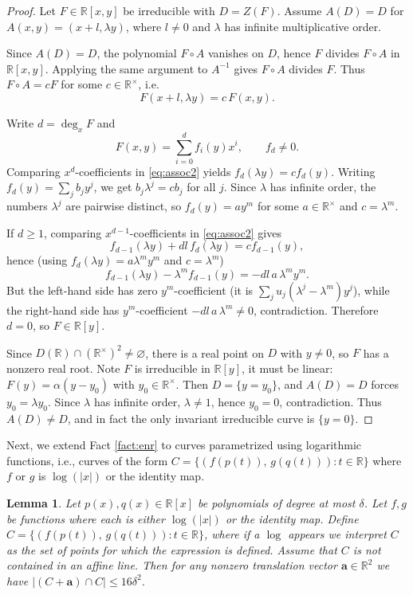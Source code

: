 \documentclass[12pt,reqno]{amsart}
\numberwithin{equation}{section}
\newtheorem{lemma}[theorem]{Lemma}
\begin{document}
\begin{proof}
Let $F\in\mathbb R[x,y]$ be irreducible with $D=Z(F)$.
Assume $A(D)=D$ for $A(x,y)=(x+l,\lambda y)$, where $l\neq 0$ and $\lambda$ has infinite multiplicative order.

Since $A(D)=D$, the polynomial $F\circ A$ vanishes on $D$, hence $F$ divides $F\circ A$ in $\mathbb R[x,y]$.
Applying the same argument to $A^{-1}$ gives $F\circ A$ divides $F$.
Thus $F\circ A=cF$ for some $c\in\mathbb R^\times$, i.e.
\begin{equation}\label{eq:assoc2}
F(x+l,\lambda y)=c\,F(x,y).
\end{equation}

Write $d=\deg_xF$ and
\[
F(x,y)=\sum_{i=0}^d f_i(y)x^i,\qquad f_d\neq 0.
\]
Comparing $x^d$-coefficients in \eqref{eq:assoc2} yields $f_d(\lambda y)=c f_d(y)$.
Writing $f_d(y)=\sum_j b_jy^j$, we get $b_j\lambda^j=cb_j$ for all $j$.
Since $\lambda$ has infinite order, the numbers $\lambda^j$ are pairwise distinct, so $f_d(y)=ay^m$ for some
$a\in\mathbb R^\times$ and $c=\lambda^m$.

If $d\ge 1$, comparing $x^{d-1}$-coefficients in \eqref{eq:assoc2} gives
\[
f_{d-1}(\lambda y)+dl\,f_d(\lambda y)=c f_{d-1}(y),
\]
hence (using $f_d(\lambda y)=a\lambda^my^m$ and $c=\lambda^m$)
\[
f_{d-1}(\lambda y)-\lambda^m f_{d-1}(y)=-dl\,a\,\lambda^m y^m.
\]
But the left-hand side has zero $y^m$-coefficient (it is $\sum_j u_j(\lambda^j-\lambda^m)y^j$),
while the right-hand side has $y^m$-coefficient $-dl\,a\,\lambda^m\neq 0$, contradiction.
Therefore $d=0$, so $F\in\mathbb R[y]$.

Since $D(\mathbb R)\cap(\mathbb R^\times)^2\neq\varnothing$, there is a real point on $D$ with $y\neq 0$,
so $F$ has a nonzero real root. Note $F$ is irreducible in $\mathbb R[y]$, it must be linear:
$F(y)=\alpha(y-y_0)$ with $y_0\in\mathbb R^\times$.
Then $D=\{y=y_0\}$, and $A(D)=D$ forces $y_0=\lambda y_0$.
Since $\lambda$ has infinite order, $\lambda\neq 1$, hence $y_0=0$, contradiction.
Thus $A(D)\neq D$, and in fact the only invariant irreducible curve is $\{y=0\}$.
\end{proof}



	
Next, we extend Fact \ref{fact:enr} to curves parametrized using logarithmic functions, i.e., curves of the form  $C = \{(f(p(t)),\, g(q(t))): t \in \mathbb{R}\}$ where $f$ or $g$ is $\log(|x|)$ or the identity map.  


\begin{lemma}\label{lem:sze1}
Let $p(x),q(x)\in\mathbb R[x]$ be polynomials of degree at most $\delta$.
Let $f,g$ be functions where each is either $\log(|x|)$ or the identity map.
Define
$C=\{(f(p(t)),\,g(q(t))): t\in\mathbb R\}$,
where if a $\log$ appears we interpret $C$ as the set of points for which the expression is defined.
Assume that $C$ is not contained in an affine line.
Then for any nonzero translation vector $\mathbf a\in\mathbb R^2$ we have $|(C+\mathbf a)\cap C|\le 16\delta^2$.
\end{lemma}
\end{document}
